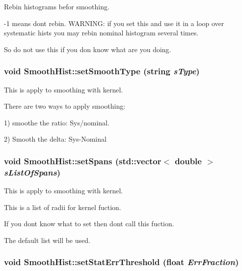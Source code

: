\label{classSmoothHist_a547095b0168773a9c913001f2426a7b2}
Rebin histograms befor smoothing.\par
 -\/1 means dont rebin. WARNING: if you set this and use it in a loop over systematic hists you may rebin nominal histogram several times.\par
 So do not use this if you don know what are you doing. \hypertarget{classSmoothHist_abf903800d8531bb255bd4f90bba39add}{
\subsubsection[{setSmoothType}]{\setlength{\rightskip}{0pt plus 5cm}void SmoothHist::setSmoothType (string {\em sType})}}
\label{classSmoothHist_abf903800d8531bb255bd4f90bba39add}
This is apply to smoothing with kernel.\par
 There are two ways to apply smoothing:\par
 1) smoothe the ratio: Sys/nominal.\par
 2) Smooth the delta: Sys-\/Nominal\par
 \hypertarget{classSmoothHist_a0f94bf39e2074d3726d322358296f8b9}{
\subsubsection[{setSpans}]{\setlength{\rightskip}{0pt plus 5cm}void SmoothHist::setSpans (std::vector$<$ double $>$ {\em sListOfSpans})}}
\label{classSmoothHist_a0f94bf39e2074d3726d322358296f8b9}
This is apply to smoothing with kernel.\par
 This is a list of radii for kernel fuction.\par
 If you dont know what to set then dont call this fuction.\par
 The default list will be used. \hypertarget{classSmoothHist_afb5c5cf363ecd6ca1f908f14c2082e1b}{
\subsubsection[{setStatErrThreshold}]{\setlength{\rightskip}{0pt plus 5cm}void SmoothHist::setStatErrThreshold (float {\em ErrFraction})}}
